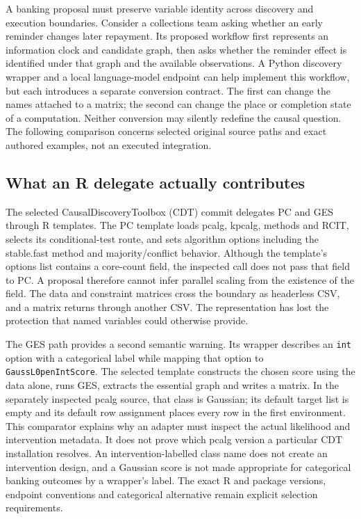 A banking proposal must preserve variable identity across discovery and execution boundaries.
Consider a collections team asking whether an early reminder changes later repayment.
Its proposed workflow first represents an information clock and candidate graph, then asks whether
the reminder effect is identified under that graph and the available observations. A Python
discovery wrapper and a local language-model endpoint can help implement this workflow, but each
introduces a separate conversion contract. The first can change the names attached to a matrix;
the second can change the place or completion state of a computation. Neither conversion may
silently redefine the causal question. The following comparison concerns selected original
source paths and exact authored examples, not an executed integration.

\subsection{What an R delegate actually contributes}
The selected CausalDiscoveryToolbox (CDT) commit delegates PC and GES through R templates.
The PC template loads pcalg, kpcalg, methods and RCIT, selects its conditional-test route, and
sets algorithm options including the stable.fast method and majority/conflict behavior.
Although the template's options list contains a core-count field, the inspected call does not
pass that field to PC. A proposal therefore cannot infer parallel scaling from the existence
of the field. The data and constraint matrices cross the boundary as headerless CSV, and a
matrix returns through another CSV. The representation has lost the protection that named
variables could otherwise provide.~\citep{exec28_bp_cdt}

The GES path provides a second semantic warning. Its wrapper describes an \texttt{int} option
with a categorical label while mapping that option to \texttt{GaussL0penIntScore}. The selected
template constructs the chosen score using the data alone, runs GES, extracts the essential
graph and writes a matrix. In the separately inspected pcalg source, that class is Gaussian;
its default target list is empty and its default row assignment places every row in the first
environment. This comparator explains why an adapter must inspect the actual likelihood and
intervention metadata. It does not prove which pcalg version a particular CDT installation
resolves. An intervention-labelled class name does not create an intervention design, and a
Gaussian score is not made appropriate for categorical banking outcomes by a wrapper's label.
The exact R and package versions, endpoint conventions and categorical alternative remain
explicit selection requirements.~\citep{exec28_bp_cdt}

